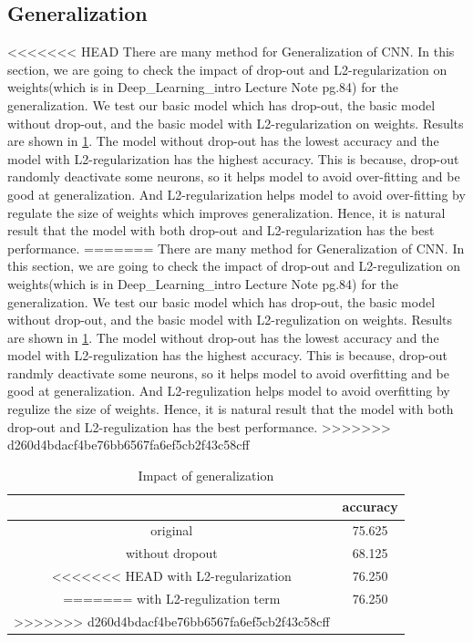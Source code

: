 \subsection{Generalization}
<<<<<<< HEAD
There are many method for Generalization of CNN. In this section, we are going to check the impact of drop-out and L2-regularization on weights(which is in Deep\_Learning\_intro Lecture Note pg.84) for the generalization.
We test our basic model which has drop-out, the basic model without drop-out, and the basic model with L2-regularization on weights. Results are shown in \cref{table:generalization}. The model without drop-out has the lowest accuracy and the model with L2-regularization has the highest accuracy. This is because, drop-out randomly deactivate some neurons, so it helps model to avoid over-fitting and be good at generalization. And L2-regularization helps model to avoid over-fitting by regulate the size of weights which improves generalization. Hence, it is natural result that the model with both drop-out and L2-regularization has the best performance.
=======
There are many method for Generalization of CNN. In this section, we are going to check the impact of drop-out and L2-regulization on weights(which is in Deep\_Learning\_intro Lecture Note pg.84) for the generalization.
We test our basic model which has drop-out, the basic model without drop-out, and the basic model with L2-regulization on weights.
Results are shown in \cref{table:generalization}. The model without drop-out has the lowest accuracy and the model with L2-regulization has the highest accuracy. 
This is because, drop-out randmly deactivate some neurons, so it helps model to avoid overfitting and be good at generalization. And L2-regulization helps model to avoid overfitting by regulize the size of weights.
Hence, it is natural result that the model with both drop-out and L2-regulization has the best performance.
>>>>>>> d260d4bdacf4be76bb6567fa6ef5cb2f43c58cff

\begin{table}[htbp]
	\centering
	\setlength{\tabcolsep}{10pt}
	\renewcommand{\arraystretch}{1.5}
	\begin{tabular}{|c||c|}
	\hline
	& accuracy  \\ \hline\hline
	original & 75.625  \\ \hline
	without dropout & 68.125  \\ \hline
<<<<<<< HEAD
	with L2-regularization & 76.250  \\ \hline
=======
	with L2-regulization term & 76.250  \\ \hline
>>>>>>> d260d4bdacf4be76bb6567fa6ef5cb2f43c58cff
	\end{tabular}
        \caption{Impact of generalization}
	\label{table:generalization}
\end{table}
	

